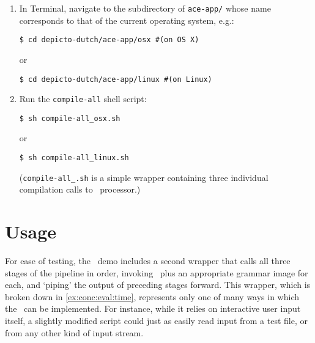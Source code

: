 \begin{enumerate}
    \item In Terminal, navigate to the subdirectory of \texttt{ace-app/}
          whose name corresponds to that of the current operating system, e.g.:
  \begin{verbatim}
$ cd depicto-dutch/ace-app/osx #(on OS X)
  \end{verbatim}
  \vspace{-0.5cm}
    or
  \begin{verbatim}
$ cd depicto-dutch/ace-app/linux #(on Linux)
  \end{verbatim}
  \vspace{-0.5cm}
    \item Run the \texttt{compile-all} shell script:
  \begin{verbatim}
$ sh compile-all_osx.sh
  \end{verbatim}
  \vspace{-0.5cm}
    or
  \begin{verbatim}
$ sh compile-all_linux.sh
  \end{verbatim}
  \vspace{-0.5cm}
  (\texttt{compile-all_{}.sh} is a simple wrapper containing three individual
   compilation calls to \ace\ processor.)
\end{enumerate}

\section*{Usage}

For ease of testing, the \depicto\ demo includes a second wrapper that calls
all three stages of the pipeline in order, invoking \ace\ plus an appropriate
grammar image for each, and `piping' the output of preceding stages forward.
This wrapper, which is broken down in \cref{ex:conc:eval:time}, represents only
one of many ways in which the \depicto\ can be implemented. For instance, while
it relies on interactive user input itself, a slightly modified script could
just as easily read input from a test file, or from any other kind of input
stream.

